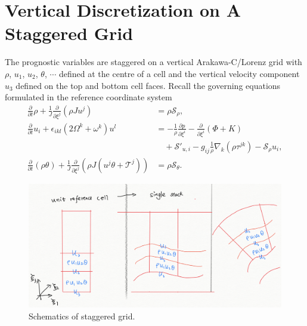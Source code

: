 \documentclass{report}
\begin{document}
\chapter{Vertical Discretization on A Staggered Grid}
The prognostic variables are staggered on a vertical Arakawa-C/Lorenz grid with $\rho$, $u_1$, $u_2$, $\theta$, $\cdots$  defined at the
centre of a cell and the vertical velocity component $u_3$ defined on the top and bottom cell faces. Recall the governing equations formulated in the reference coordinate system
\begin{subequations}
\begin{align}
\frac{\partial}{\partial t}  \rho + \frac{1}{J} \frac{\partial}{\partial \xi^j} \left(\rho J u^j\right)
    & = \rho \mathcal{S}_\rho,
    \label{e:equations_coord_hor_vert:density}\\
    \frac{\partial}{\partial t} u_i + \epsilon_{ikl} (2\Omega^k + \omega^k) u^l 
    &=  -\frac{1}{\rho} \frac{\partial p}{\partial\xi^i} 
   -  \frac{\partial}{\partial \xi^i} (\Phi + K)  \nonumber\\
    & \quad + \mathcal{S}'_{u, i} - g_{ij} \frac{1}{\rho} \nabla_k (\rho \tau^{jk}) - \mathcal{S}_\rho u_i,
    \label{e:equations_coord_hor_vert:velocity}\\
        \frac{\partial}{\partial t}  (\rho \theta) + \frac{1}{J} \frac{\partial}{\partial \xi^j} \left(\rho J (u^j \theta + \mathcal{T}^j)\right)
    & = \rho \mathcal{S}_\theta.
    \label{e:equations_coord_hor_vert:theta}
\end{align}
\end{subequations}



\begin{figure}
    \centering
    \includegraphics[width=0.8 \textwidth]{CLIMA-numerics/figures/staggered/StaggeredGrid.png}
    \caption{Schematics of staggered grid.}
    \label{fig:staggered-grid}
\end{figure}
\end{document}
